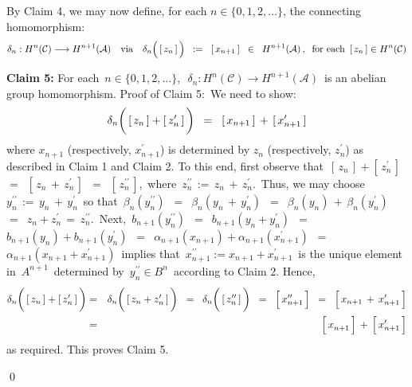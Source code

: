 \vskip 0.5cm
\noindent
By Claim 4, we may now define, for each $n \in \{0,1,2,\ldots\}$, the connecting homomorphism:
\begin{equation*}
\delta_{n} : H^{n}(\mathcal{C}) \longrightarrow H^{n+1}(\mathcal{A})
\quad\textnormal{via}\quad
\delta_{n}\!\left(\,[\,\overset{{\color{white}-}}{z_{n}}\,]\,\right)
\;\; := \;\;
	[\,x_{n+1}\,]
\;\; \in \;\;
	H^{n+1}(\mathcal{A})\,,
\;\;
\textnormal{for each \,$[\,z_{n}\,] \in H^{n}(\mathcal{C})$}
\end{equation*}


\vskip 0.5cm
\noindent
\textbf{Claim 5:}\;\;
For each \,$n \in \{0, 1, 2, \ldots\}$,\,
\,$\delta_{n} : H^{n}(\mathcal{C}) \longrightarrow H^{n+1}(\mathcal{A})$\,
is an abelian group homomorphism.
\vskip 0.2cm
\noindent
Proof of Claim 5:\,
We need to show:
\begin{equation*}
\delta_{n}\!\left(\,[\,z_{n}\,] \overset{{\color{white}-}}{+} [\,z_{n}^{\prime}\,]\,\right)
\;\; = \;\;
	[\,x_{n+1}\,] \,+\, [\,x_{n+1}^{\prime}\,]
\end{equation*}
where $x_{n+1}$ (respectively, $x_{n+1}^{\prime}$) is determined
by $z_{n}$ (respectively, $z_{n}^{\prime}$) as described in Claim 1 and Claim 2.
To this end, first observe that
\,$[\,z_{n}\,] + [\,z_{n}^{\prime}\,]$\,
$=$
\,$[\,z_{n} \,+\, z_{n}^{\prime}\,]$\,
$=$
\,$[\,z_{n}^{\prime\prime}\,]$,\,
where
\,$z_{n}^{\prime\prime} \,:=\, z_{n} \,+\, z_{n}^{\prime}$.\,
Thus, we may choose
\,$y_{n}^{\prime\prime} \,:=\, y_{n} \,+\, y_{n}^{\prime}$\,
so that
\,$\beta_{n}(y_{n}^{\prime\prime})$
\,$=$\, $\beta_{n}(y_{n} \,+\, y_{n}^{\prime})$
\,$=$\, $\beta_{n}(y_{n}) \,+\, \beta_{n}(y_{n}^{\prime})$
\,$=$\, $z_{n} + z_{n}^{\prime} \,=\, z_{n}^{\prime\prime}$.\,
Next,
\,$b_{n+1}(y_{n}^{\prime\prime})$
\,$=$\, $b_{n+1}(y_{n} + y_{n}^{\prime})$
\,$=$\, $b_{n+1}(y_{n}) + b_{n+1}(y_{n}^{\prime})$
\,$=$\, $\alpha_{n+1}(x_{n+1}) + \alpha_{n+1}(x_{n+1}^{\prime})$
\,$=$\, $\alpha_{n+1}(x_{n+1} + x_{n+1}^{\prime})$\,
implies that
\,$x_{n+1}^{\prime\prime} := x_{n+1} + x_{n+1}^{\prime}$\,
is the unique element in \,$A^{n+1}$\, determined by \,$y_{n}^{\prime\prime} \in B^{n}$\,
according to Claim 2.
Hence,
\begin{eqnarray*}
\delta_{n}\!\left(\,[\,z_{n}\,] \overset{{\color{white}-}}{+} [\,z_{n}^{\prime}\,]\,\right)
& = &
	\delta_{n}\!\left(\,[\,z_{n} \overset{{\color{white}-}}{+} z_{n}^{\prime}\,]\,\right)
\;\; = \;\;
	\delta_{n}\!\left(\,[\,\overset{{\color{white}-}}{z_{n}^{\prime\prime}}\,]\,\right)
\;\; = \;\;
	\left[\,\overset{{\color{white}.}}{x_{n+1}^{\prime\prime}}\,\right]
\;\; = \;\;
	\left[\,x_{n+1} \,+\, \overset{{\color{white}.}}{x_{n+1}^{\prime}}\,\right]
\\
& = &
	\left[\,\overset{{\color{white}.}}{x_{n+1}^{{\color{white}\prime}}}\,\right]
	\, + \,
	\left[\,\overset{{\color{white}.}}{x_{n+1}^{\prime}}\,\right]
\end{eqnarray*}
as required.
This proves Claim 5.


\qed

